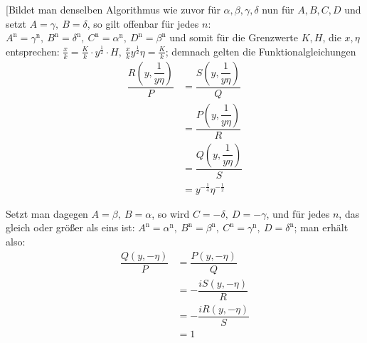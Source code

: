 \begingroup
\renewcommand{\arraystretch}{1.45}
[Bildet man denselben Algorithmus wie zuvor für $\alpha,\allowbreak \beta,\allowbreak \gamma,\allowbreak \delta$ nun für $A,\allowbreak B,\allowbreak C,\allowbreak D$ und setzt $A=\gamma,\allowbreak \ B=\delta$, so gilt offenbar für jedes $n$: $A^{\mathrm n}=\gamma^{\mathrm n},\allowbreak \ B^{\mathrm n}=\delta^{\mathrm n},\allowbreak \ C^{\mathrm n}=\alpha^{\mathrm n},\allowbreak \ D^{\mathrm n}=\beta^{\mathrm n}$ und somit für die Grenzwerte $K,\allowbreak H$, die
$x,\allowbreak \eta$ entsprechen: $\frac{x}k=\frac Kk\cdot y^{\frac12}\cdot H,\allowbreak \ \frac{x}k y^{\frac12}\eta=\frac Kk$; demnach gelten die Funktionalgleichungen
\[
\begin{aligned}\dfrac{R(y,\dfrac1{y\eta})}P
&=\dfrac{S(y,\dfrac1{y\eta})}Q
\\[7pt]&=\dfrac{P(y,\dfrac1{y\eta})}R
\\[7pt]&=\dfrac{Q(y,\dfrac1{y\eta})}S
\\[7pt]&=y^{-\frac14}\eta^{-\frac12}\end{aligned}
\]

Setzt man dagegen $A=\beta,\allowbreak \ B=\alpha$, so wird $C=-\delta,\allowbreak \ D=-\gamma$, und für jedes $n$, das gleich oder größer als eins ist: $A^{\mathrm n}=\alpha^{\mathrm n},\allowbreak \ B^{\mathrm n}=\beta^{\mathrm n},\allowbreak \ C^{\mathrm n}=\gamma^{\mathrm n},\allowbreak \ D=\delta^{\mathrm n}$; man erhält also:
\[
\begin{aligned}\dfrac{Q(y,-\eta)}P
&=\dfrac{P(y,-\eta)}Q
\\[7pt]&=-\dfrac{iS(y,-\eta)}R
\\[7pt]&=-\dfrac{iR(y,-\eta)}S\\[7pt]&=1\end{aligned}
\]

